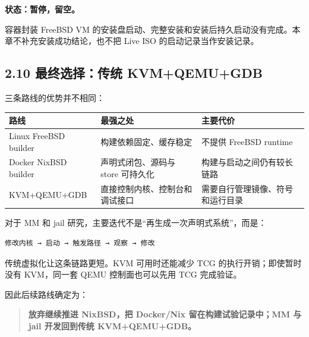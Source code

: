 \documentclass[
  11pt,
  UTF8,
  a4paper,
  fontset=fandol]{ctexart}
\begin{document}
\textbf{状态：暂停，留空。}

容器封装 FreeBSD VM
的安装盘启动、完整安装和安装后持久启动没有完成。本章不补充安装成功结论，也不把
Live ISO 的启动记录当作安装记录。

\subsection{2.10 最终选择：传统
KVM+QEMU+GDB}\label{ux6700ux7ec8ux9009ux62e9ux4f20ux7edf-kvmqemugdb}

三条路线的优势并不相同：

\begin{longtable}[]{@{}
  >{\raggedright\arraybackslash}p{}
  >{\raggedright\arraybackslash}p{}
  >{\raggedright\arraybackslash}p{}@{}}
\toprule\noalign{}
\begin{minipage}[b]{\linewidth}\raggedright
路线
\end{minipage} & \begin{minipage}[b]{\linewidth}\raggedright
最强之处
\end{minipage} & \begin{minipage}[b]{\linewidth}\raggedright
主要代价
\end{minipage} \\
\midrule\noalign{}
\endhead
\bottomrule\noalign{}
\endlastfoot
Linux FreeBSD builder & 构建依赖固定、缓存稳定 & 不提供 FreeBSD
runtime \\
Docker NixBSD builder & 声明式闭包、源码与 store 可持久化 &
构建与启动之间仍有较长链路 \\
KVM+QEMU+GDB & 直接控制内核、控制台和调试接口 &
需要自行管理镜像、符号和运行目录 \\
\end{longtable}

对于 MM 和 jail 研究，主要迭代不是``再生成一次声明式系统''，而是：

\begin{lstlisting}
修改内核 → 启动 → 触发路径 → 观察 → 修改
\end{lstlisting}

传统虚拟化让这条链路更短。KVM 可用时还能减少 TCG
的执行开销；即使暂时没有 KVM，同一套 QEMU 控制面也可以先用 TCG
完成验证。

因此后续路线确定为：

\begin{quote}
\textbf{放弃继续推进 NixBSD，把 Docker/Nix 留在构建试验记录中；MM 与
jail 开发回到传统 KVM+QEMU+GDB。}
\end{quote}
\end{document}
